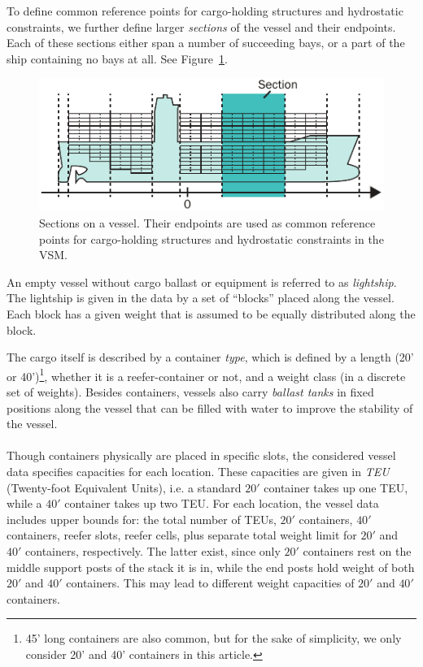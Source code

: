 To define common reference points for cargo-holding structures and hydrostatic constraints, we further define larger \emph{sections} of the vessel and their endpoints. Each of these sections either span a number of succeeding bays, or a part of the ship containing no bays at all.
See Figure~\ref{fig:sectionEndPoints}.

\begin{figure}[hb]
	\centering
		\includegraphics{figures/sectionEndPoints.pdf}
	\caption{Sections on a vessel. Their endpoints are used as common reference points for cargo-holding structures and hydrostatic constraints in the VSM.}
	\label{fig:sectionEndPoints}
\end{figure}

An empty vessel without cargo ballast or equipment is referred to as \emph{lightship}.  The lightship is given in the data by a set of ``blocks'' placed along the vessel. Each block has a given weight that is assumed to be equally distributed along the block.

The cargo itself is described by a container \emph{type}, which is defined by a length (20' or 40')\footnote{45' long containers are also common, but for the sake of simplicity, we only consider 20' and 40' containers in this article.}, whether it is a reefer-container or not, and a weight class (in a discrete set of weights). 
Besides containers, vessels also carry \emph{ballast tanks} in fixed positions along the vessel that can be filled with water to improve the stability of the vessel.
\\\\
Though containers physically are placed in specific slots, the considered vessel data specifies capacities for each location. These capacities are given in \emph{TEU} (Twenty-foot Equivalent Units), i.e. a standard $20'$ container takes up one TEU, while a $40'$ container takes up two TEU. For each location, the vessel data includes upper bounds for: the total number of TEUs, $20'$ containers, $40'$ containers, reefer slots, reefer cells, plus separate total weight limit for $20'$ and $40'$ containers, respectively. The latter exist, since only $20'$ containers rest on the middle support posts of the stack it is in, while the end posts hold weight of both $20'$ and $40'$ containers. This may lead to different weight capacities of $20'$ and $40'$ containers.

